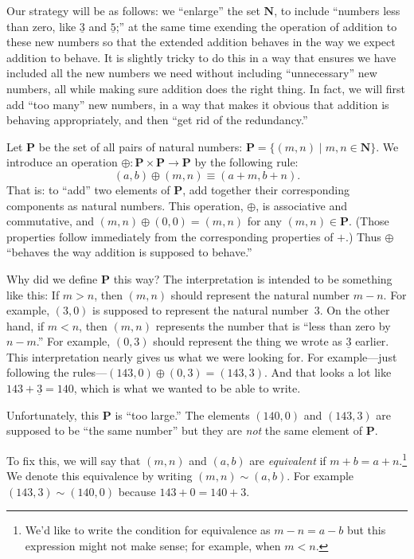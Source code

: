 \documentclass[10pt, a4paper, twocolumn]{article}
\newcommand{\set}[1]{\mathbold{#1}}
\newcommand{\N}{\set{N}}
\newcommand{\pairs}{\set{P}}
\newcommand{\minus}[1]{\underline{#1}}
\begin{document}
Our strategy will be as follows: we ``enlarge'' the set $\N$, to
include ``numbers less than zero, like $\minus{3}$ and $\minus{5}$;''
at the same time exending the operation of addition to these new
numbers so that the extended addition behaves in the way we expect
addition to behave. It is slightly tricky to do this in a way that
ensures we have included all the new numbers we need without
including ``unnecessary'' new numbers, all while making sure addition
does the right thing. In fact, we will first add ``too many'' new
numbers, in a way that makes it obvious that addition is behaving
appropriately, and then ``get rid of the redundancy.''

Let $\pairs$ be the set of all pairs of natural numbers: $\pairs =
\{(m, n) \mid m,n\in \N\}$. We introduce an operation
$\oplus:\pairs\times\pairs\to\pairs$ by the following rule:
\begin{equation}\label{pairs:addition}
  (a, b) \oplus (m, n) \equiv (a + m, b + n).
\end{equation}
That is: to ``add'' two elements of $\pairs$, add together their
corresponding components as natural numbers. This operation, $\oplus$, is
associative and commutative, and $(m,n)\oplus(0,0) = (m,n)$ for any
$(m,n)\in\pairs$. (Those properties follow immediately from the
corresponding properties of $+$.) Thus $\oplus$ ``behaves the way addition
is supposed to behave.''

Why did we define $\pairs$ this way? The interpretation is intended to
be something like this: If $m>n$, then $(m,n)$ should represent the
natural number $m-n$. For example, $(3,0)$ is supposed to represent
the natural number~$3$. On the other hand, if $m<n$, then $(m,n)$
represents the number that is ``less than zero by $n-m$.'' For
example, $(0,3)$ should represent the thing we wrote as $\minus{3}$
earlier. This interpretation nearly gives us what we were looking
for. For example---just following the rules---$(143,0) \oplus (0,3) =
(143,3)$. And that looks a lot like $143+\minus{3}=140$, which is what
we wanted to be able to write.

Unfortunately, this $\pairs$ is ``too large.'' The elements $(140,0)$
and $(143,3)$ are supposed to be ``the same number'' but they are
\emph{not} the same element of $\pairs$.

To fix this, we will say that $(m,n)$ and $(a,b)$ are
\emph{equivalent} if $m + b = a + n$.\footnote{We'd like to
write the condition for equivalence as $m-n=a-b$ but this expression
might not make sense; for example, when $m<n$.} We denote this equivalence by
writing $(m,n) \sim (a,b)$. For example $(143,3)\sim(140,0)$ because
$143+0=140+3$. 
\end{document}
